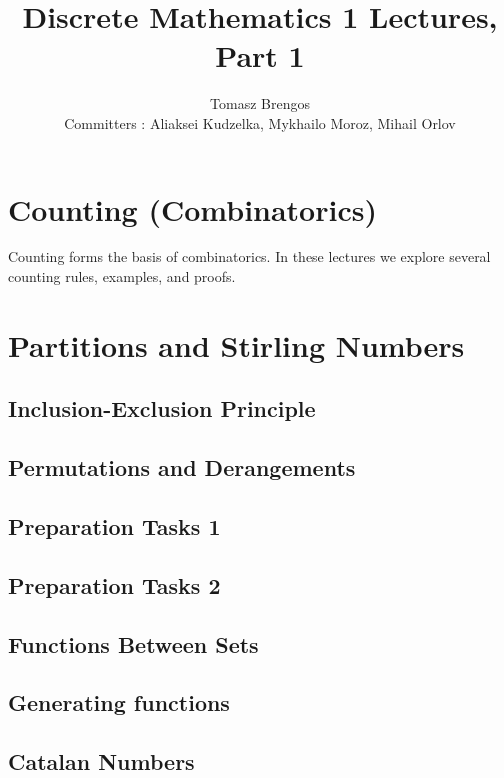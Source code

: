 \documentclass{article}
\title{Discrete Mathematics 1 Lectures, Part 1}
\author{Tomasz Brengos \\  
Committers : Aliaksei Kudzelka, Mykhailo Moroz, Mihail Orlov}
\date{}
\newcommand{\includelectureSub}[1]{%
  \begingroup
    \renewcommand{\section}{\subsection}%
  \endgroup
}
\newcommand{\includelectureNoHeader}[1]{%
  \begingroup
    \let\maketitle\relax%
  \endgroup
}
\begin{document}
\maketitle
\cleardoublepage %
\tableofcontents

\section{Counting (Combinatorics)}
Counting forms the basis of combinatorics. In these lectures we explore several counting rules, examples, and proofs.
\includelectureSub{Counting}

\section{Partitions and Stirling Numbers}
\includelectureSub{Partitions_StirlingNumbers}

\section{Inclusion-Exclusion Principle}
\includelectureNoHeader{Inclusion_Exclusion}

\section{Permutations and Derangements}
\includelectureSub{Permutations_Derangements}

\section{Preparation Tasks 1}
\includelectureSub{Preparation_tasks1}

\section{Preparation Tasks 2}
\includelectureSub{Preparation_tasks2}

\section{Functions Between Sets}
\includelectureNoHeader{Functions_between_sets}

\section{Generating functions}
\includelectureSub{Generating_functions}

\section{Catalan Numbers}
\includelectureSub{Catalan_Numbers}
\end{document}
